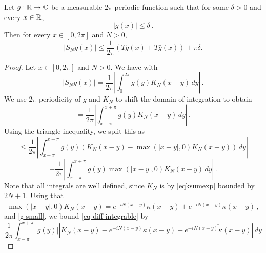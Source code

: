 \begin{lemma}
    \label{partial-Fourier-sum-bound}
    \leanok
    Let $g:{\mathbb{R}}\to\mathbb{C}$ be a measurable $2\pi$-periodic function such that for some $\delta>0$ and every $x\in{\mathbb{R}}$,
    \begin{equation}
        |g(x)|\le \delta \,.
    \end{equation}
    Then for every $x\in [0,2\pi]$ and $N>0$,
    \begin{equation*}
        |S_N g(x)| \le \frac{1}{2\pi} (Tg(x) + T\bar{g}(x)) + \pi\delta.
    \end{equation*}
\end{lemma}

\begin{proof}
    \leanok
    Let $x\in [0,2\pi]$ and $N>0$. We have with 
    \begin{equation*}
        |S_N g(x)| = \frac{1}{2\pi} \left| \int_0^{2\pi} g(y) K_N(x-y) \, dy\right|\,.
    \end{equation*}
    We use $2\pi$-periodicity of $g$ and $K_N$ to shift the domain of integration to obtain
    \begin{equation*}
        = \frac{1}{2\pi} \left|\int_{x-\pi}^{x+\pi} g(y) K_N(x-y) \, dy\right|\,.
    \end{equation*}
    Using the triangle inequality, we split this as
    \begin{equation}
        \label{eq-diff-integrable}
        \le \frac{1}{2\pi} \left|\int_{x-\pi}^{x+\pi} g(y) \left(K_N(x-y) - \max(|x-y|,0) K_N(x-y)\right) \, dy \right|
    \end{equation}
    \begin{equation}
        \label{eq-diff-singular}
        + \frac{1}{2\pi} \left|\int_{x-\pi}^{x+\pi} g(y) \max(|x-y|,0) K_N(x-y) \, dy\right|\,.
    \end{equation}
    Note that all integrals are well defined, since $K_N$ is by \eqref{eqksumexp} bounded by $2N+1$.
    Using that
    \begin{equation}
        \label{eq-Dirichlet-Hilbert}
        \max(|x-y|,0) K_N(x-y) = e^{-iN(x-y)}\kappa(x-y) + \overline{e^{-iN(x-y)}\kappa(x-y)} \,,
    \end{equation}
     and \eqref{g-small}, we bound \eqref{eq-diff-integrable} by
    \begin{equation*}
        \frac{1}{2\pi} \int_{x-\pi}^{x+\pi} |g(y)| \left|K_N(x-y) - e^{-iN(x-y)}\kappa(x-y) + \overline{e^{-iN(x-y)}\kappa(x-y)}\right|\, dy

\end{equation*}
\end{proof}
